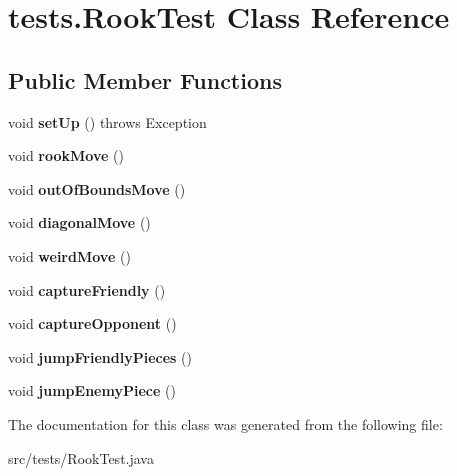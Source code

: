 \hypertarget{classtests_1_1_rook_test}{\section{tests.\-Rook\-Test Class Reference}
\label{classtests_1_1_rook_test}
}
\subsection*{Public Member Functions}
\begin{DoxyCompactItemize}
\item 
\hypertarget{classtests_1_1_rook_test_ac7fe423ff8f896171b032e8880d0dacc}{void {\bfseries set\-Up} ()  throws Exception }\label{classtests_1_1_rook_test_ac7fe423ff8f896171b032e8880d0dacc}

\item 
\hypertarget{classtests_1_1_rook_test_a52e338e8983e3e1f5ed4feaa0144f2c8}{void {\bfseries rook\-Move} ()}\label{classtests_1_1_rook_test_a52e338e8983e3e1f5ed4feaa0144f2c8}

\item 
\hypertarget{classtests_1_1_rook_test_a9b6fc097864ea974cd2e0cc4ec98ac34}{void {\bfseries out\-Of\-Bounds\-Move} ()}\label{classtests_1_1_rook_test_a9b6fc097864ea974cd2e0cc4ec98ac34}

\item 
\hypertarget{classtests_1_1_rook_test_aa253359c8f3d21b225c7c53f1dadecda}{void {\bfseries diagonal\-Move} ()}\label{classtests_1_1_rook_test_aa253359c8f3d21b225c7c53f1dadecda}

\item 
\hypertarget{classtests_1_1_rook_test_aa847c3fad4c2332d76a7f2adea1d8073}{void {\bfseries weird\-Move} ()}\label{classtests_1_1_rook_test_aa847c3fad4c2332d76a7f2adea1d8073}

\item 
\hypertarget{classtests_1_1_rook_test_a7f7092edba619c12981e3b620bfa1761}{void {\bfseries capture\-Friendly} ()}\label{classtests_1_1_rook_test_a7f7092edba619c12981e3b620bfa1761}

\item 
\hypertarget{classtests_1_1_rook_test_ad6100119730fbfb1784a7ce290bace3a}{void {\bfseries capture\-Opponent} ()}\label{classtests_1_1_rook_test_ad6100119730fbfb1784a7ce290bace3a}

\item 
\hypertarget{classtests_1_1_rook_test_ac1f70f4418be047d6e3fb6911253b172}{void {\bfseries jump\-Friendly\-Pieces} ()}\label{classtests_1_1_rook_test_ac1f70f4418be047d6e3fb6911253b172}

\item 
\hypertarget{classtests_1_1_rook_test_a4c6cee3a224f404f625f6534c9ca7dfd}{void {\bfseries jump\-Enemy\-Piece} ()}\label{classtests_1_1_rook_test_a4c6cee3a224f404f625f6534c9ca7dfd}

\end{DoxyCompactItemize}


The documentation for this class was generated from the following file\-:\begin{DoxyCompactItemize}
\item 
src/tests/Rook\-Test.\-java\end{DoxyCompactItemize}
